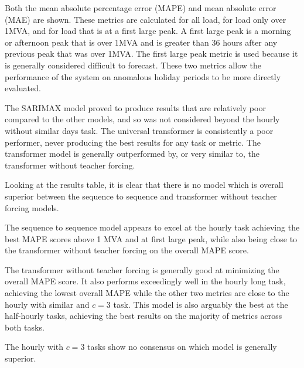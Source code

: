 Both the mean absolute percentage error (MAPE) and mean absolute error (MAE) are shown.
These metrics are calculated for all load, for load only over 1MVA, and for load that is at a first large peak.
A first large peak is a morning or afternoon peak that is over 1MVA and is greater than 36 hours after any previous peak that was over 1MVA.
The first large peak metric is used because it is generally considered difficult to forecast.
These two metrics allow the performance of the system on anomalous holiday periods to be more directly evaluated.

The SARIMAX model proved to produce results that are relatively poor compared to the other models, and so was not considered beyond the hourly without similar days task.
The universal transformer is consistently a poor performer, never producing the best results for any task or metric.
The transformer model is generally outperformed by, or very similar to, the transformer without teacher forcing.

Looking at the results table, it is clear that there is no model which is overall superior between the sequence to sequence and transformer without teacher forcing models.

The sequence to sequence model appears to excel at the hourly task achieving the best MAPE scores above 1 MVA and at first large peak, while also being close to the transformer without teacher forcing on the overall MAPE score.

The transformer without teacher forcing is generally good at minimizing the overall MAPE score.
It also performs exceedingly well in the hourly long task, achieving the lowest overall MAPE while the other two metrics are close to the hourly with similar and $c=3$ task.
This model is also arguably the best at the half-hourly tasks, achieving the best results on the majority of metrics across both tasks. 

The hourly with $c=3$ tasks show no consensus on which model is generally superior.


